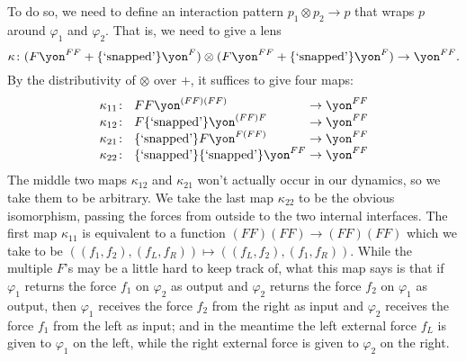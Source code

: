 \documentclass[Book-Poly]{subfiles}
\begin{document}
\begin{example}
To do so, we need to define an interaction pattern $p_1\otimes p_2\to p$ that wraps $p$ around $\varphi_1$ and $\varphi_2$.
That is, we need to give a lens
\[
    \kappa\colon (F\yon^{FF}+\{\text{`snapped'}\}\yon^F)\otimes (F\yon^{FF}+\{\text{`snapped'}\}\yon^F)\to\yon^{FF}.
\]
By the distributivity of $\otimes$ over $+$, it suffices to give four maps:
\begin{equation}\label{eqn.snapped_maps}
\arraycolsep=1.4pt
\begin{array}{lll}
	\kappa_{11}\colon&~ FF\yon^{(FF)(FF)}&\to\yon^{FF}\\
	\kappa_{12}\colon&~ F\{\text{`snapped'}\}\yon^{(FF)F}&\to\yon^{FF}\\
	\kappa_{21}\colon&~ \{\text{`snapped'}\}F\yon^{F(FF)}&\to\yon^{FF}\\
	\kappa_{22}\colon&~ \{\text{`snapped'}\}\{\text{`snapped'}\}\yon^{FF}&\to\yon^{FF}
\end{array}
\end{equation}
The middle two maps $\kappa_{12}$ and $\kappa_{21}$ won't actually occur in our dynamics, so we take them to be arbitrary.
We take the last map $\kappa_{22}$ to be the obvious isomorphism, passing the forces from outside to the two internal interfaces.
The first map $\kappa_{11}$ is equivalent to a function $(FF)(FF)\to (FF)(FF)$ which we take to be $((f_1,f_2),(f_L,f_R))\mapsto((f_L,f_2),(f_1,f_R))$.
While the multiple $F$'s may be a little hard to keep track of, what this map says is that if $\varphi_1$ returns the force $f_1$ on $\varphi_2$ as output and $\varphi_2$ returns the force $f_2$ on $\varphi_1$ as output, then $\varphi_1$ receives the force $f_2$ from the right as input and $\varphi_2$ receives the force $f_1$ from the left as input; and in the meantime the left external force $f_L$ is given to $\varphi_1$ on the left, while the right external force is given to $\varphi_2$ on the right.


\end{example}
\end{document}
